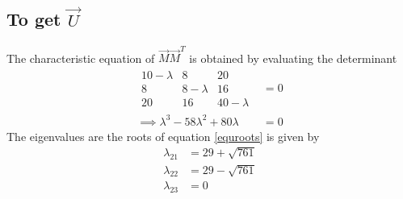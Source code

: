 \documentclass[journal,12pt,twocolumn]{IEEEtran}
\begin{document}
\subsection{To get $\vec{U}$ }
The characteristic equation of $\vec{M}\vec{M}^T$ is obtained by evaluating the determinant 
\begin{align}
   \begin{array}{|ccc|}
10-\lambda & 8 & 20 \\ 8 & 8-\lambda & 16\\20 & 16 & 40-\lambda
\end{array}&=0\\
\implies \lambda^3-58\lambda^2+80\lambda&=0\label{equroots}
\end{align}
The eigenvalues are the roots of equation \ref{equroots} is given by 
\begin{align}
    \lambda_{21}&=29+\sqrt{761}\label{eqeig1}\\
    \lambda_{22}&=29-\sqrt{761}\label{eqeig2}\\
    \lambda_{23}&=0
\end{align}
\end{document}
